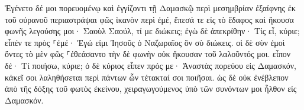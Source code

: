 \documentclass{openreader}
\begin{document}
Ἐγένετο δέ μοι πορευομένῳ καὶ ἐγγίζοντι τῇ Δαμασκῷ περὶ μεσημβρίαν ἐξαίφνης ἐκ τοῦ οὐρανοῦ περιαστράψαι φῶς ἱκανὸν περὶ ἐμέ, 
ἔπεσά τε εἰς τὸ ἔδαφος καὶ ἤκουσα φωνῆς λεγούσης μοι· Σαοὺλ Σαούλ, τί με διώκεις; 
ἐγὼ δὲ ἀπεκρίθην· Τίς εἶ, κύριε; εἶπέν τε πρὸς ⸀ἐμέ· Ἐγώ εἰμι Ἰησοῦς ὁ Ναζωραῖος ὃν σὺ διώκεις. 
οἱ δὲ σὺν ἐμοὶ ὄντες τὸ μὲν φῶς ⸀ἐθεάσαντο τὴν δὲ φωνὴν οὐκ ἤκουσαν τοῦ λαλοῦντός μοι. 
εἶπον δέ· Τί ποιήσω, κύριε; ὁ δὲ κύριος εἶπεν πρός με· Ἀναστὰς πορεύου εἰς Δαμασκόν, κἀκεῖ σοι λαληθήσεται περὶ πάντων ὧν τέτακταί σοι ποιῆσαι. 
ὡς δὲ οὐκ ἐνέβλεπον ἀπὸ τῆς δόξης τοῦ φωτὸς ἐκείνου, χειραγωγούμενος ὑπὸ τῶν συνόντων μοι ἦλθον εἰς Δαμασκόν. 
\end{document}
